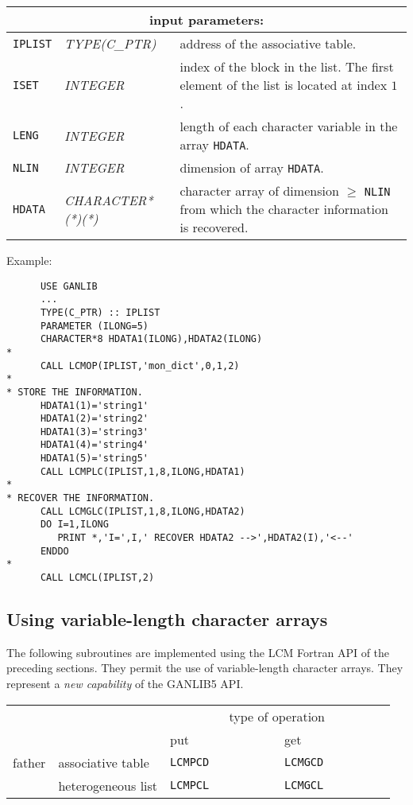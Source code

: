 \noindent
\begin{tabular}{|p{1.5cm}|p{3.5cm}|p{9.5cm}|}
\hline
\multicolumn{3}{|c|}{\bf input parameters:} \\
\hline
{\tt IPLIST} & {\it TYPE(C\_PTR)} & address of the associative table. \\
\hline
{\tt ISET} & {\it INTEGER} & index of the block in the list.
The first element of the list is located at index $1$. \\
\hline
{\tt LENG} & {\it INTEGER} & length of each character variable in the array {\tt HDATA}. \\
\hline
{\tt NLIN} & {\it INTEGER} & dimension of array {\tt HDATA}. \\
\hline
{\tt HDATA} & {\it CHARACTER*(*)(*)} & character array of dimension $\ge$ {\tt NLIN} from which the character information is recovered. \\
\hline
\end{tabular}

\vskip 0.4cm
\goodbreak

\noindent Example:
\begin{verbatim}
      USE GANLIB
      ...
      TYPE(C_PTR) :: IPLIST
      PARAMETER (ILONG=5)
      CHARACTER*8 HDATA1(ILONG),HDATA2(ILONG)
*
      CALL LCMOP(IPLIST,'mon_dict',0,1,2)
*
* STORE THE INFORMATION.
      HDATA1(1)='string1'
      HDATA1(2)='string2'
      HDATA1(3)='string3'
      HDATA1(4)='string4'
      HDATA1(5)='string5'
      CALL LCMPLC(IPLIST,1,8,ILONG,HDATA1)
*
* RECOVER THE INFORMATION.
      CALL LCMGLC(IPLIST,1,8,ILONG,HDATA2)
      DO I=1,ILONG
         PRINT *,'I=',I,' RECOVER HDATA2 -->',HDATA2(I),'<--'
      ENDDO
*
      CALL LCMCL(IPLIST,2)
\end{verbatim}

\subsection{Using variable-length character arrays}

The following subroutines are implemented using the LCM Fortran API of the preceding sections. They
permit the use of variable-length character arrays. They represent a {\sl new capability} of the GANLIB5 API.

\vskip 0.4cm

\begin{center}
\begin{tabular}{|c|l|l|l|}
\cline{3-4}
\multicolumn{2}{c|}{} & \multicolumn{2}{c|}{type of operation} \\
\cline{3-4}
\multicolumn{2}{c|}{} & put~~~~~~~~~~~~~ & get~~~~~~~~~~~~~ \\
\hline
father & associative table & {\tt LCMPCD} & {\tt LCMGCD} \\
\cline{2-4}
       & heterogeneous list & {\tt LCMPCL} & {\tt LCMGCL} \\
\hline
\end{tabular}
\end{center}

